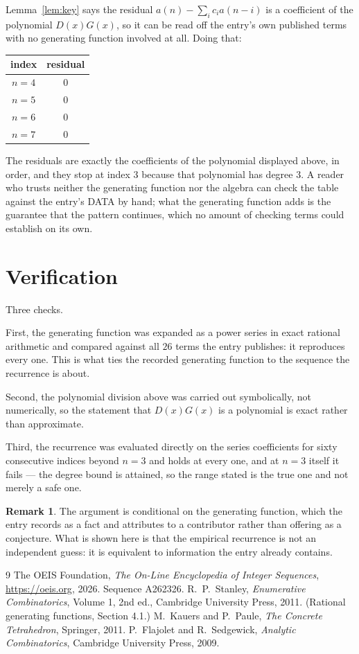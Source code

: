 \documentclass[11pt,a4paper]{article}
\theoremstyle{plain}
\theoremstyle{definition}
\newtheorem{remark}[theorem]{Remark}
\begin{document}
Lemma~\ref{lem:key} says the residual $a(n)-\sum_ic_ia(n-i)$ is a coefficient of the
polynomial $D(x)G(x)$, so it can be read off the entry's own published terms with no
generating function involved at all. Doing that:
\begin{center}
\begin{tabular}{cc}
index & residual \\ \hline
$n=4$ & $0$ \\
$n=5$ & $0$ \\
$n=6$ & $0$ \\
$n=7$ & $0$
\end{tabular}
\end{center}
The residuals are exactly the coefficients of the polynomial displayed above, in order, and
they stop at index $3$ because that polynomial has degree $3$. A reader who trusts
neither the generating function nor the algebra can check the table against the entry's DATA
by hand; what the generating function adds is the guarantee that the pattern continues, which
no amount of checking terms could establish on its own.

\section{Verification}

Three checks.

First, the generating function was expanded as a power series in exact rational arithmetic and
compared against all $26$ terms the entry publishes: it reproduces every one. This is
what ties the recorded generating function to the sequence the recurrence is about.

Second, the polynomial division above was carried out symbolically, not numerically, so the
statement that $D(x)G(x)$ is a polynomial is exact rather than approximate.

Third, the recurrence was evaluated directly on the series coefficients for sixty consecutive
indices beyond $n=3$ and holds at every one, and at $n=3$ itself it fails --- the
degree bound is attained, so the range stated is the true one and not merely a safe one.

\begin{remark}
The argument is conditional on the generating function, which the entry records as a fact and
attributes to a contributor rather than offering as a conjecture. What is shown here is that
the empirical recurrence is not an independent guess: it is equivalent to information the
entry already contains.
\end{remark}

\begin{thebibliography}{9}
 The OEIS Foundation, \emph{The On-Line Encyclopedia of Integer
Sequences}, \url{https://oeis.org}, 2026. Sequence A262326.
 R.~P.~Stanley, \emph{Enumerative Combinatorics}, Volume 1, 2nd ed.,
Cambridge University Press, 2011. (Rational generating functions, Section 4.1.)
 M.~Kauers and P.~Paule, \emph{The Concrete Tetrahedron}, Springer, 2011.
 P.~Flajolet and R.~Sedgewick, \emph{Analytic Combinatorics}, Cambridge
University Press, 2009.
\end{thebibliography}
\end{document}
